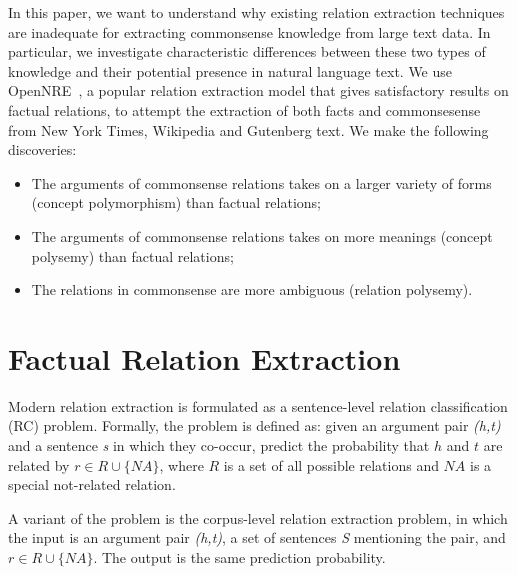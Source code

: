 \documentclass[11pt,a4paper]{article}
\begin{document}
In this paper, we want to understand why existing relation extraction
techniques are inadequate for extracting commonsense knowledge from large 
text data. In particular, we investigate characteristic differences between
these two types of knowledge and their potential presence in natural language
text. We use OpenNRE~\cite{lin2016neural}, a popular relation extraction model 
that gives satisfactory 
results on factual relations, to attempt the 
extraction of both facts and commonsesense from New York Times, Wikipedia and
Gutenberg text. We make the following discoveries:
\begin{itemize}
	\item The arguments of commonsense relations takes on a 
larger variety of forms (concept polymorphism) than factual relations; 
	\item The arguments of commonsense relations takes on more
meanings (concept polysemy) than factual relations;
	\item The relations in commonsense are more ambiguous (relation
polysemy).
\end{itemize}

\section{Factual Relation Extraction}
\label{sec:factual}
Modern relation extraction is formulated as a sentence-level relation classification (RC) problem.  Formally, the problem is defined as: 
given an argument pair \textit{(h,t)} and a sentence \textit{s} 
in which they co-occur, predict the probability that $h$ and $t$ are related by
$r \in R\cup\{NA\}$, where $R$ is a set of all possible relations and $NA$ is a special
not-related relation. 

A variant of the problem is the corpus-level relation extraction problem, in which
the input is an argument pair \textit{(h,t)}, a set of sentences \textit{S} 
mentioning the pair, and $r \in R \cup \{NA\}$. The output is the same prediction probability.

\end{document}
